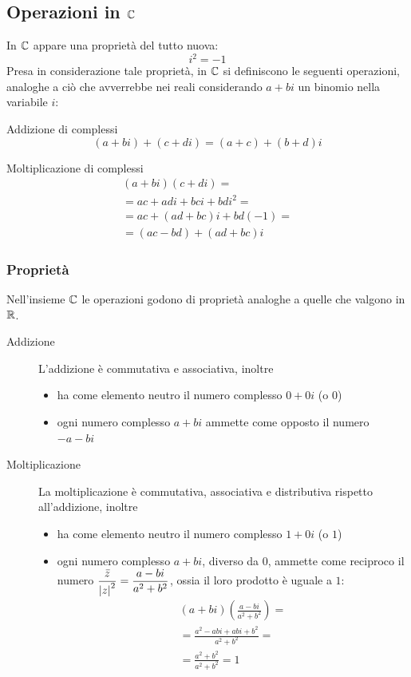 \subsection{Operazioni in \texorpdfstring{$\mathbb{C}$}{C}}
In $\mathbb{C}$ appare una proprietà del tutto nuova:
\[
	i^2=-1
\]
Presa in considerazione tale proprietà, in $\mathbb{C}$ si definiscono le seguenti operazioni, analoghe a ciò che avverrebbe nei reali considerando $a+bi$ un binomio nella variabile $i$:
\begin{defin}{Addizione di complessi}
	\[
		(a+bi)+(c+di)=(a+c)+(b+d)i
	\]
\end{defin}
\begin{defin}{Moltiplicazione di complessi}
	\begin{gather*}
		(a+bi)(c+di)=\\
		=ac+adi+bci+bdi^2=\\
		=ac+(ad+bc)i+bd(-1)=\\
		=(ac-bd)+(ad+bc)i
	\end{gather*}
\end{defin}

\subsubsection{Proprietà}
Nell'insieme $\mathbb{C}$ le operazioni godono di proprietà analoghe a quelle che valgono in $\mathbb{R}$.
\begin{description}
	\item[Addizione] L'addizione è commutativa e associativa, inoltre
		\begin{itemize}
			\item ha come elemento neutro il numero complesso $0+0i$ (o $0$)
			\item ogni numero complesso $a+bi$ ammette come opposto il numero $-a-bi$
		\end{itemize}
	\item[Moltiplicazione] La moltiplicazione è commutativa, associativa e distributiva rispetto all'addizione, inoltre
		\begin{itemize}
			\item ha come elemento neutro il numero complesso $1+0i$ (o $1$)
			\item ogni numero complesso $a+bi$, diverso da $0$, ammette come reciproco il numero $\dfrac{\bar z}{\left\lvert z \right\rvert^2}=\dfrac{a-bi}{a^2+b^2}$, ossia il loro prodotto è uguale a $1$:
			      \begin{gather*}
				      ( a + bi ) \left( \frac{a - bi}{a^2 + b^2} \right) = \\
				      = \frac{a^2 - abi + abi + b^2}{a^2 + b^2} = \\
				      = \frac{a^2 + b^2}{a^2 + b^2} = 1
			      \end{gather*}
		\end{itemize}
\end{description}

